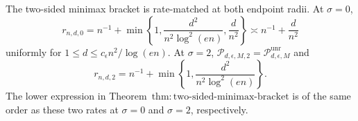 The two-sided minimax bracket is rate-matched at both endpoint radii.  At \(\sigma=0\),
\[
 r_{n,d,0}=n^{-1}+\min\left\{1,\frac{d^2}{n^2\log^2(en)},\frac d{n^2}\right\}
 \asymp n^{-1}+\frac d{n^2}
\]
uniformly for \(1\le d\le c_{\epsilon}n^2/\log(en)\).  At \(\sigma=2\),
\(\mathcal P_{d,\epsilon,M,2}=\mathcal P_{d,\epsilon,M}^{\mathrm{unr}}\) and
\[
 r_{n,d,2}=n^{-1}+\min\left\{1,\frac{d^2}{n^2\log^2(en)}\right\}.
\]
The lower expression in Theorem~\(\mathrm{thm:two\text{-}sided\text{-}minimax\text{-}bracket}\) is of the same order as these two rates at \(\sigma=0\) and \(\sigma=2\), respectively.